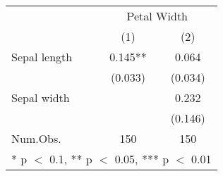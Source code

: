 \begin{table}
\centering
\begin{tabular}[t]{lcc}
\toprule
& \multicolumn{2}{c}{Petal Width} \\
  & (1) & (2)\\
\midrule
Sepal length & 0.145** & 0.064\\
 & (0.033) & (0.034)\\
Sepal width &  & 0.232\\
 &  & (0.146)\\
\midrule
Num.Obs. & 150 & 150\\
\bottomrule
\multicolumn{3}{l}{\rule{0pt}{1em}* p $<$ 0.1, ** p $<$ 0.05, *** p $<$ 0.01}\\
\end{tabular}
\end{table}
